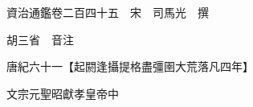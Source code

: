 










 


 
 


 

  
  
  
  
  





  
  
  
  
  
 
  

  

  
  
  



  

 
 

  
   




  

  
  


  　　資治通鑑卷二百四十五　宋　司馬光　撰

　　胡三省　音注

　　唐紀六十一【起閼逢攝提格盡彊圉大荒落凡四年】

　　文宗元聖昭獻孝皇帝中

